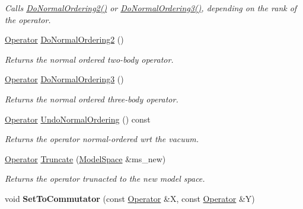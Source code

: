\begin{DoxyCompactItemize}
\begin{DoxyCompactList}\small\item\em Calls \hyperlink{classOperator_a652d989590422a2b26e662625b07254e}{Do\+Normal\+Ordering2()} or \hyperlink{classOperator_a7fd029569796107c87ff17c5a7912480}{Do\+Normal\+Ordering3()}, depending on the rank of the operator. \end{DoxyCompactList}\item 
\hyperlink{classOperator}{Operator} \hyperlink{classOperator_a652d989590422a2b26e662625b07254e}{Do\+Normal\+Ordering2} ()
\begin{DoxyCompactList}\small\item\em Returns the normal ordered two-\/body operator. \end{DoxyCompactList}\item 
\hyperlink{classOperator}{Operator} \hyperlink{classOperator_a7fd029569796107c87ff17c5a7912480}{Do\+Normal\+Ordering3} ()
\begin{DoxyCompactList}\small\item\em Returns the normal ordered three-\/body operator. \end{DoxyCompactList}\item 
\hyperlink{classOperator}{Operator} \hyperlink{classOperator_a5fd8c62bf910df71736eb2b8bcf60ca5}{Undo\+Normal\+Ordering} () const 
\begin{DoxyCompactList}\small\item\em Returns the operator normal-\/ordered wrt the vacuum. \end{DoxyCompactList}\item 
\hyperlink{classOperator}{Operator} \hyperlink{classOperator_ac2eb154c97ceff6f86cd3d24ddb4da1f}{Truncate} (\hyperlink{classModelSpace}{Model\+Space} \&ms\+\_\+new)
\begin{DoxyCompactList}\small\item\em Returns the operator trunacted to the new model space. \end{DoxyCompactList}\item 
void {\bfseries Set\+To\+Commutator} (const \hyperlink{classOperator}{Operator} \&X, const \hyperlink{classOperator}{Operator} \&Y)\hypertarget{classOperator_afeebc062fa99c993e65e46a99b1008d7}{}\label{classOperator_afeebc062fa99c993e65e46a99b1008d7}


\end{DoxyCompactItemize}

